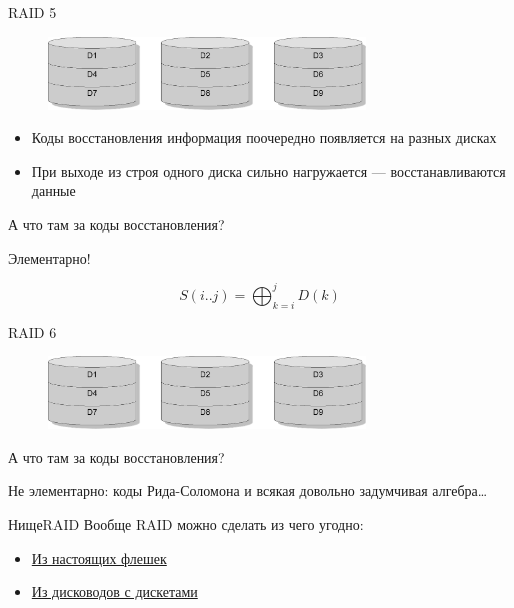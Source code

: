 \documentclass[xetex,aspectratio=43]{beamer}
\begin{document}
\begin{frame}{RAID 5}
    \begin{figure}
        \includegraphics[width=0.75\textwidth, page=4]{img/10.raids-crop.pdf}
    \end{figure}

\begin{itemize}
\tightlist
\item
  Коды восстановления информация поочередно появляется на разных дисках
\item
  При выходе из строя одного диска сильно нагружается ---
  восстанавливаются данные
\end{itemize}

А что там за коды восстановления?

\pause

Элементарно!

\[S(i..j) = \displaystyle\bigoplus_{k=i}^jD(k)\]
\end{frame}

\begin{frame}{RAID 6}
    \begin{figure}
        \includegraphics[width=0.75\textwidth, page=5]{img/10.raids-crop.pdf}
    \end{figure}

А что там за коды восстановления?

\pause

Не элементарно: коды Рида-Соломона и всякая довольно задумчивая алгебра\ldots
\end{frame}

\begin{frame}{НищеRAID}
    Вообще RAID можно сделать из чего угодно:
    \begin{itemize}
    \item \href{https://youtu.be/dougISKs2vQ}{Из настоящих флешек}
    \item \href{https://youtu.be/Uxj7So3h-lw}{Из дисководов с дискетами}
    \end{itemize}
\end{frame}
\end{document}

